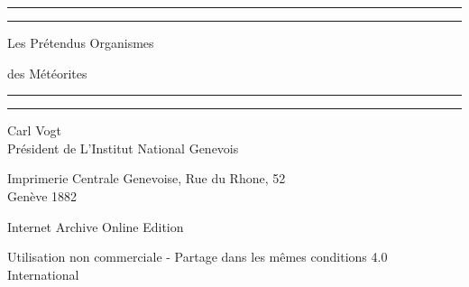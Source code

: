 \documentclass[a4paper, 12pt, oneside, french]{book}
\begin{document}
\begin{titlepage} %
	\centering %
	\scshape %

	
	\rule{\textwidth}{1.6pt}\vspace*{-\baselineskip}\vspace*{2pt} %
	\rule{\textwidth}{0.4pt} %
	
	\vspace{1.5\baselineskip} %
	
	{\LARGE Les Prétendus Organismes}

	\vspace{1.2\baselineskip}

	{\LARGE des Météorites}

	\vspace{1\baselineskip} %

	\rule{\textwidth}{0.4pt}\vspace*{-\baselineskip}\vspace{3.2pt} %
	\rule{\textwidth}{1.6pt} %
	
	\vspace{1\baselineskip} %
	
	
	{Carl Vogt\\ Président de L'Institut National Genevois} %
	
	\vspace*{1\baselineskip} %
	
    \vspace*{\fill}

	{\small\scshape }

    {Imprimerie Centrale Genevoise, Rue du Rhone, 52\\ Genève 1882} %
    
    Internet Archive Online Edition  %
	
	{Utilisation non commerciale - Partage dans les mêmes conditions 4.0 International} %
\end{titlepage}
\setlength{\parskip}{1mm plus1mm minus1mm}
\clearpage
\frenchspacing
\pagestyle{fancy}
\fancyhf{}
\cfoot{\thepage}
\end{document}
